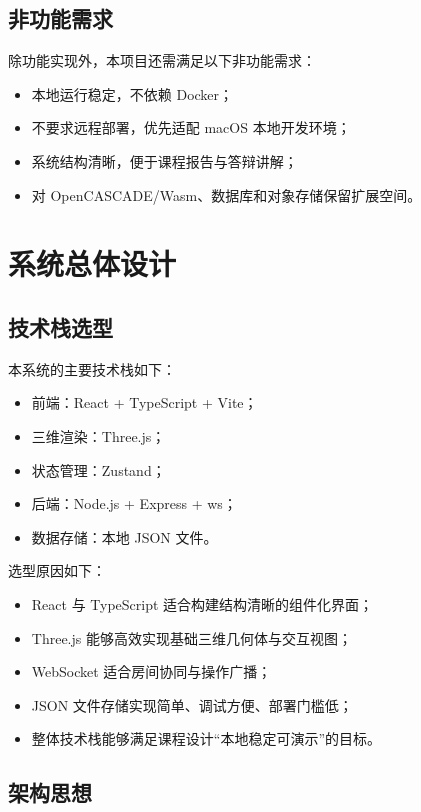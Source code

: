\documentclass[supercite,macfont]{HustGSClassPaper}
\begin{document}
\subsection{非功能需求}

除功能实现外，本项目还需满足以下非功能需求：

\begin{itemize}[leftmargin=2em]
  \item 本地运行稳定，不依赖 Docker；
  \item 不要求远程部署，优先适配 macOS 本地开发环境；
  \item 系统结构清晰，便于课程报告与答辩讲解；
  \item 对 OpenCASCADE/Wasm、数据库和对象存储保留扩展空间。
\end{itemize}

\section{系统总体设计}

\subsection{技术栈选型}

本系统的主要技术栈如下：

\begin{itemize}[leftmargin=2em]
  \item 前端：React + TypeScript + Vite；
  \item 三维渲染：Three.js；
  \item 状态管理：Zustand；
  \item 后端：Node.js + Express + ws；
  \item 数据存储：本地 JSON 文件。
\end{itemize}

选型原因如下：

\begin{itemize}[leftmargin=2em]
  \item React 与 TypeScript 适合构建结构清晰的组件化界面；
  \item Three.js 能够高效实现基础三维几何体与交互视图；
  \item WebSocket 适合房间协同与操作广播；
  \item JSON 文件存储实现简单、调试方便、部署门槛低；
  \item 整体技术栈能够满足课程设计“本地稳定可演示”的目标。
\end{itemize}

\subsection{架构思想}
\end{document}
